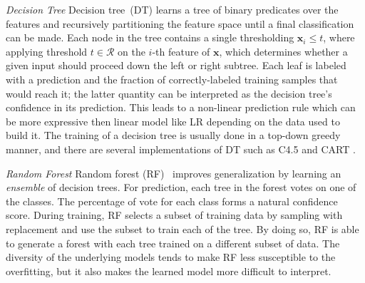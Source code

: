\documentclass[conference]{IEEEtran}
\begin{document}
\emph{Decision Tree}
Decision tree~(DT) learns a tree of binary predicates over the features and
recursively partitioning the feature space until a final classification can
be made.
%
Each node in the tree contains a single thresholding $\mathbf{x}_i \leq t$, where
applying threshold $t \in \mathcal{R}$ on the $i$-th feature of $\mathbf{x}$,
which determines whether a given input should proceed down the left or right
subtree.
%
Each leaf is labeled with a prediction and the fraction of
correctly-labeled training samples that would reach it; the latter
quantity can be interpreted as the decision tree's confidence in its
prediction.
%
This leads to a non-linear prediction rule which can be more expressive
then linear model like LR depending on the data used to build it.
%
The training of a decision tree is usually done in a top-down greedy manner,
and there are several implementations of DT such as C4.5
\cite{quinlan2014c4} and CART \cite{breiman2017classification}.


\emph{Random Forest}
%
Random forest (RF)~\cite{breiman2001random} improves generalization by
learning an \emph{ensemble} of decision trees.
For prediction, each tree in the forest votes on one of the classes.
The percentage of vote for each class forms a natural confidence score.
During training, RF selects a subset of training data by sampling with
replacement and use the subset to train each of the tree.
By doing so, RF is able to generate a forest with each tree trained on
a different subset of data.
The diversity of the underlying models tends to make RF less susceptible to
the overfitting, but it also makes the learned model more difficult to
interpret.
%

%
\end{document}
